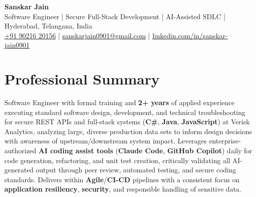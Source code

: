 \documentclass[a4paper,10pt]{article}
\begin{document}
\begin{center}
    {\LARGE \textbf{Sanskar Jain}} \\
    \vspace{2pt}
    Software Engineer \;|\; Secure Full-Stack Development \;|\; AI-Assisted SDLC \;|\; Hyderabad, Telangana, India \\
    \vspace{2pt}
    \href{tel:+919021620156}{+91 90216 20156} \;|\;
    \href{mailto:sanskarjain0901@gmail.com}{sanskarjain0901@gmail.com} \;|\;
    \href{https://www.linkedin.com/in/sanskar-jain0901/}{linkedin.com/in/sanskar-jain0901}
\end{center}

\vspace{1pt}

\section*{Professional Summary}
Software Engineer with formal training and \textbf{2+ years} of applied experience executing standard software design, development, and technical troubleshooting for secure REST APIs and full-stack systems (\textbf{C\#}, \textbf{Java}, \textbf{JavaScript}) at Verisk Analytics, analyzing large, diverse production data sets to inform design decisions with awareness of upstream/downstream system impact.
Leverages enterprise-authorized \textbf{AI coding assist tools} (\textbf{Claude Code}, \textbf{GitHub Copilot}) daily for code generation, refactoring, and unit test creation, critically validating all AI-generated output through peer review, automated testing, and secure coding standards.
Delivers within \textbf{Agile}/\textbf{CI-CD} pipelines with a consistent focus on \textbf{application resiliency}, \textbf{security}, and responsible handling of sensitive data.
\end{document}
